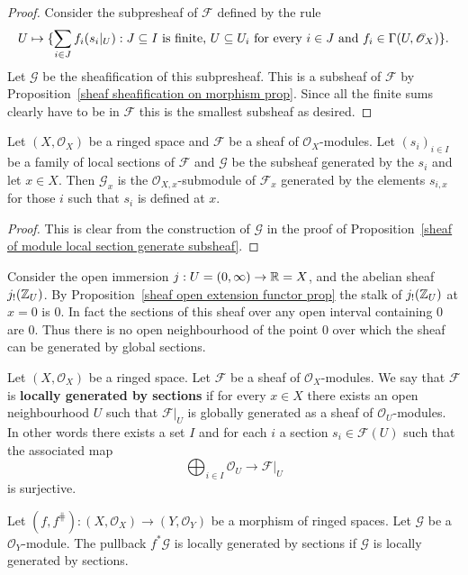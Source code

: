 \begin{proof}
Consider the subpresheaf of $\mathscr{F}$ defined by the rule
\[U\mapsto\{\sum_{i\in J}f_i(s_i|_U):\text{$J\subseteq I$ is finite, $U\subseteq U_i$ for every $i\in J$ and $f_i\in\Gamma(U,\mathscr{O}_X)$}\}.\]
Let $\mathscr{G}$ be the sheafification of this subpresheaf. This is a subsheaf of $\mathscr{F}$ by Proposition~\ref{sheaf sheafification on morphism prop}. Since all the finite sums clearly have to be in $\mathscr{F}$ this is the smallest subsheaf as desired.
\end{proof}
\begin{proposition}
Let $(X,\mathscr{O}_X)$ be a ringed space and $\mathscr{F}$ be a sheaf of $\mathscr{O}_X$-modules. Let $(s_i)_{i\in I}$ be a family of local sections of $\mathscr{F}$ and $\mathscr{G}$ be the subsheaf generated by the $s_i$ and let $x\in X$. Then $\mathscr{G}_x$ is the $\mathscr{O}_{X,x}$-submodule of $\mathscr{F}_x$ generated by the elements $s_{i,x}$ for those $i$ such that $s_i$ is defined at $x$.
\end{proposition}
\begin{proof}
This is clear from the construction of $\mathscr{G}$ in the proof of Proposition~\ref{sheaf of module local section generate subsheaf}.
\end{proof}
\begin{example}\label{sheaf of module not generated by global section eg}
Consider the open immersion $j:U=(0,\infty)\to\mathbb{R}=X$, and the abelian sheaf $j_!(\mathbb{Z}_U)$. By Proposition~\ref{sheaf open extension functor prop} the stalk of $j_!(\mathbb{Z}_U)$ at $x=0$ is $0$. In fact the sections of this sheaf over any open interval containing $0$ are $0$. Thus there is no open neighbourhood of the point $0$ over which the sheaf can be generated by global sections.
\end{example}
Let $(X,\mathscr{O}_X)$ be a ringed space. Let $\mathscr{F}$ be a sheaf of $\mathscr{O}_X$-modules. We say that $\mathscr{F}$ is \textbf{locally generated by sections} if for every $x\in X$ there exists an open neighbourhood $U$ such that $\mathscr{F}|_U$ is globally generated as a sheaf of $\mathscr{O}_U$-modules. In other words there exists a set $I$ and for each $i$ a section $s_i\in\mathscr{F}(U)$ such that the associated map
\[\bigoplus_{i\in I}\mathscr{O}_U\to\mathscr{F}|_U\]
is surjective.
\begin{proposition}\label{pull back local generated section}
Let $(f,f^{\hash}):(X,\mathscr{O}_X)\to(Y,\mathscr{O}_Y)$ be a morphism of ringed spaces. Let $\mathscr{G}$ be a $\mathscr{O}_Y$-module. The pullback $f^*\mathscr{G}$ is locally generated by sections if $\mathscr{G}$ is locally generated by sections.
\end{proposition}
